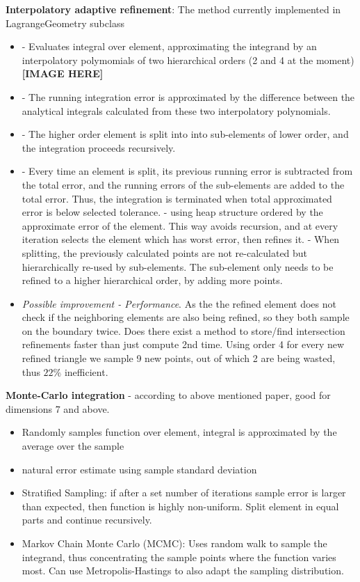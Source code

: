 \documentclass[12pt]{article}
\begin{document}
\noindent
\textbf{Interpolatory adaptive refinement}: The method currently implemented in LagrangeGeometry subclass
\begin{itemize}
	\item - Evaluates integral over element, approximating the integrand by an interpolatory polymomials of two hierarchical orders (2 and 4 at the moment) \textbf{[IMAGE HERE]}
	\item - The running integration error is approximated by the difference between the analytical integrals calculated from these two interpolatory polynomials.
	\item - The higher order element is split into into sub-elements of lower order, and the integration proceeds recursively.
	\item - Every time an element is split, its previous running error is subtracted from the total error, and the running errors of the sub-elements are added to the total error. Thus, the integration is terminated when total approximated error is below selected tolerance. 	
		\subitem - using heap structure ordered by the approximate error of the element. This way avoids recursion, and at every iteration selects the element which has worst error, then refines it.
		\subitem - When splitting, the previously calculated points are not re-calculated but hierarchically re-used by sub-elements. The sub-element only needs to be refined to a higher hierarchical order, by adding more points.
	\item \textit{Possible improvement - Performance}. As the the refined element does not check if the neighboring elements are also being refined, so they both sample on the boundary twice. Does there exist a method to store/find intersection refinements faster than just compute 2nd time. Using order 4 for every new refined triangle we sample 9 new points, out of which 2 are being wasted, thus $22\%$ inefficient.
\end{itemize}

\noindent
\textbf{Monte-Carlo integration} - according to above mentioned paper, good for dimensions 7 and above.
\begin{itemize}
	\item Randomly samples function over element, integral is approximated by the average over the sample
	\item natural error estimate using sample standard deviation
	\item Stratified Sampling: if after a set number of iterations sample error is larger than expected, then function is highly non-uniform. Split element in equal parts and continue recursively.
	\item Markov Chain Monte Carlo (MCMC): Uses random walk to sample the integrand, thus concentrating the sample points where the function varies most. Can use Metropolis-Hastings to also adapt the sampling distribution.
\end{itemize}
\end{document}
